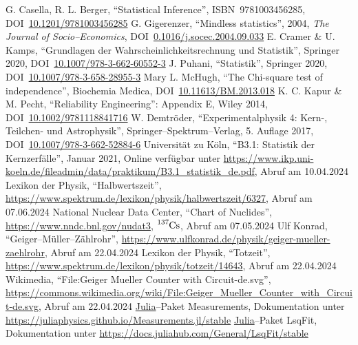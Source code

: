 \documentclass[12pt,a4paper]{scrartcl}
\numberwithin{equation}{section} %
\newcommand{\code}[1]{\textsf{#1}}
\begin{document}
\begin{thebibliography}{99}
	G. Casella, R. L. Berger, ``Statistical Inference'', ISBN~9781003456285,
	DOI~\href{https://doi.org/10.1201/9781003456285}{10.1201/9781003456285}
	G. Gigerenzer, ``Mindless statistics'', 2004, \emph{The Journal of
		Socio--Economics},
		DOI~\href{https://doi.org/10.1016/j.socec.2004.09.033}{0.1016/j.socec.2004.09.033}
	E. Cramer \& U. Kamps, ``Grundlagen der Wahrscheinlichkeitsrechnung
	und Statistik'', Springer 2020, DOI~\href{https://doi.org/10.1007/978-3-662-60552-3}{10.1007/978-3-662-60552-3}
	J. Puhani, ``Statistik'', Springer 2020, DOI~\href{https://doi.org/10.1007/978-3-658-28955-3}{10.1007/978-3-658-28955-3}
	Mary L. McHugh, ``The Chi-square test of independence'', Biochemia Medica, DOI~\href{https://doi.org/10.11613/BM.2013.018}{10.11613/BM.2013.018}
	K. C. Kapur \& M. Pecht, ``Reliability Engineering'': Appendix E,
	Wiley 2014,
	DOI~\href{https://doi.org/10.1002/9781118841716}{10.1002/9781118841716}
	W. Demtröder, ``Experimentalphysik 4: Kern-, Teilchen- und Astrophysik'',
	Springer--Spektrum--Verlag, 5. Auflage 2017, DOI~\href{https://doi.org/10.1007/978-3-662-52884-6}{10.1007/978-3-662-52884-6}
	Universität zu Köln, ``B3.1: Statistik der Kernzerfälle'', Januar
	2021, Online verfügbar unter
	\url{https://www.ikp.uni-koeln.de/fileadmin/data/praktikum/B3.1_statistik_de.pdf}, Abruf am 10.04.2024
	Lexikon der Physik, ``Halbwertszeit'', \url{https://www.spektrum.de/lexikon/physik/halbwertszeit/6327}, Abruf am 07.06.2024
	National Nuclear Data Center, ``Chart of Nuclides'',
	\url{https://www.nndc.bnl.gov/nudat3}, $\ce{^{137}Cs}$,
	Abruf am 07.05.2024
	Ulf Konrad, ``Geiger--Müller--Zählrohr'', \url{https://www.ulfkonrad.de/physik/geiger-mueller-zaehlrohr}, Abruf am 22.04.2024
	Lexikon der Physik, ``Totzeit'', \url{https://www.spektrum.de/lexikon/physik/totzeit/14643}, Abruf am 22.04.2024
	Wikimedia, ``File:Geiger Mueller Counter with Circuit-de.svg'', \url{https://commons.wikimedia.org/wiki/File:Geiger_Mueller_Counter_with_Circuit-de.svg}, Abruf am 22.04.2024
	\code{\href{https://julialang.org}{Julia}}--Paket \code{Measurements}, Dokumentation unter \url{https://juliaphysics.github.io/Measurements.jl/stable}
	\code{\href{https://julialang.org}{Julia}}--Paket \code{LsqFit},
	Dokumentation unter \url{https://docs.juliahub.com/General/LsqFit/stable}
\end{thebibliography}
\end{document}

